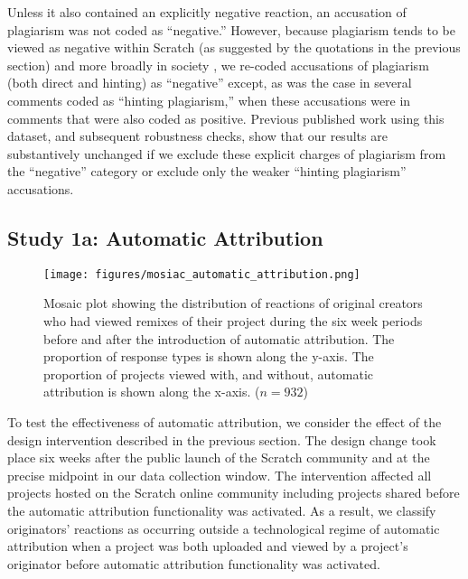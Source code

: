 Unless it also contained an explicitly negative reaction, an
accusation of plagiarism was not coded as ``negative.''  However,
because plagiarism tends to be viewed as negative within
Scratch (as suggested by the quotations in the previous section) and
more broadly in society \cite{posner_little_2007}, we re-coded
accusations of plagiarism (both direct and hinting) as ``negative''
except, as was the case in several comments coded as ``hinting
plagiarism,'' when these accusations were in comments that were also
coded as positive. Previous published work using this dataset, and
subsequent robustness checks, show that our results are substantively
unchanged if we exclude these explicit charges of plagiarism from the
``negative'' category or exclude only the weaker ``hinting
plagiarism'' accusations.

\subsection{Study 1a: Automatic Attribution}

\begin{figure}
\begin{center}
\texttt{[image: figures/mosiac\_automatic\_attribution.png]}
\caption{Mosaic plot showing the distribution of reactions of original
  creators who had viewed remixes of their project during the six week
  periods before and after the introduction of automatic
  attribution. The proportion of response types is shown along the
  y-axis. The proportion of projects viewed with, and without,
  automatic attribution is shown along the x-axis. ($n=932$)}
\label{fig:mosauto}
\end{center}
\end{figure}

To test the effectiveness of automatic attribution, we consider the
effect of the design intervention described in the previous section.
The design change took place six weeks after the public launch of the
Scratch community and at the precise midpoint in our data collection
window. The intervention affected all projects hosted on the Scratch
online community including projects shared before the automatic
attribution functionality was activated. As a result, we classify
originators' reactions as occurring outside a technological regime of
automatic attribution when a project was both uploaded and viewed by a
project's originator before automatic attribution functionality was
activated.

